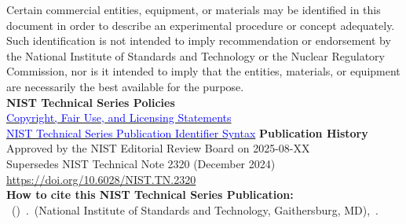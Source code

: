 \begin{titlepage}
\begin{flushleft}
\footnotesize  Certain commercial entities, equipment, or materials may be identified in this document in order to describe an experimental procedure or concept adequately. Such identification is not intended to imply recommendation or endorsement by the National Institute of Standards and Technology or the Nuclear Regulatory Commission, nor is it intended to imply that the entities, materials, or equipment are necessarily the best available for the purpose.\\
\vfill
\footnotesize
{\textbf{NIST Technical Series Policies}}\\
  {{\href{https://www.nist.gov/nist-research-library/nist-publications}{\textcolor{blue}{Copyright, Fair Use, and Licensing Statements}}\\
\href{https://www.nist.gov/system/files/documents/2022/04/01/PubID_Syntax_NIST_TechPubs.pdf}{\textcolor{blue}{NIST Technical Series Publication Identifier Syntax}}}}
\vfill
{\textbf{Publication History}}\\
  {Approved by the NIST Editorial Review Board on 2025-08-XX}\\
  {Supersedes NIST Technical Note 2320 (December 2024) \href{https://doi.org/10.6028/NIST.TN.2320}{https://doi.org/10.6028/NIST.TN.2320}}\\
\vfill
{\textbf{How to cite this NIST Technical Series Publication:}} \\
  {\authorlist~(\pubyear)~\pubtitle.~(National Institute of Standards and Technology, Gaithersburg, MD),~\pubnumber.~ \DOI}
\vfill

\end{flushleft}
\end{titlepage}

